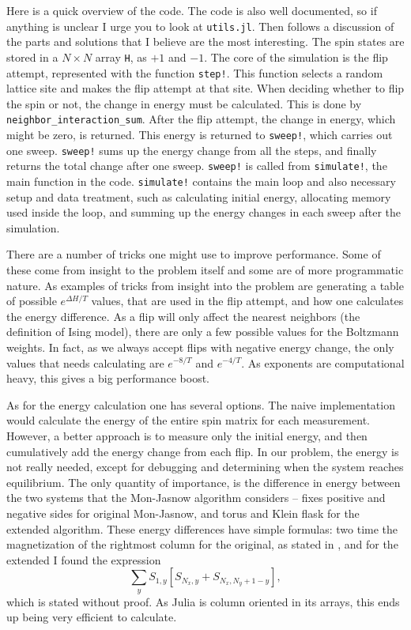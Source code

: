 \documentclass[12pt, a4paper]{article}
\begin{document}
Here is a quick overview of the code.
The code is also well documented, so if anything is unclear I urge you to look at \verb|utils.jl|.
Then follows a discussion of the parts and solutions that I believe are the most interesting.
The spin states are stored in a $N \times N$ array \verb|H|, as $+1$ and $-1$.
The core of the simulation is the flip attempt, represented with the function \verb|step!|.
This function selects a random lattice site and makes the flip attempt at that site.
When deciding whether to flip the spin or not, the change in energy must be calculated.
This is done by \verb|neighbor_interaction_sum|.
After the flip attempt, the change in energy, which might be zero, is returned.
This energy is returned to \verb|sweep!|, which carries out one sweep.
\verb|sweep!| sums up the energy change from all the steps, and finally returns the total change after one sweep.
\verb|sweep!| is called from \verb|simulate!|, the main function in the code.
\verb|simulate!| contains the main loop and also necessary setup and data treatment, such as calculating initial energy, allocating memory used inside the loop, and summing up the energy changes in each sweep after the simulation.


There are a number of tricks one might use to improve performance.
Some of these come from insight to the problem itself and some are of more programmatic nature.
As examples of tricks from insight into the problem are generating a table of possible $e^{\Delta H/T}$ values, that are used in the flip attempt, and how one calculates the energy difference.
As a flip will only affect the nearest neighbors (the definition of Ising model), there are only a few possible values for the Boltzmann weights.
In fact, as we always accept flips with negative energy change, the only values that needs calculating are $e^{-8/T}$ and $e^{-4/T}$.
As exponents are computational heavy, this gives a big performance boost.


As for the energy calculation one has several options.
The naive implementation would calculate the energy of the entire spin matrix for each measurement.
However, a better approach is to measure only the initial energy, and then cumulatively add the energy change from each flip.
In our problem, the energy is not really needed, except for debugging and determining when the system reaches equilibrium.
The only quantity of importance, is the difference in energy between the two systems that the Mon-Jasnow algorithm considers -- fixes positive and negative sides for original Mon-Jasnow, and torus and Klein flask for the extended algorithm.
These energy differences have simple formulas: two time the magnetization of the rightmost column for the original, as stated in \cite{mon_jasnow}, and for the extended I found the expression
\begin{equation}
  \sum_y S_{1,y} [ S_{N_x, y} + S_{N_x, N_y+1-y} ],
\end{equation}
which is stated without proof.
As Julia is column oriented in its arrays, this ends up being very efficient to calculate.
\end{document}
